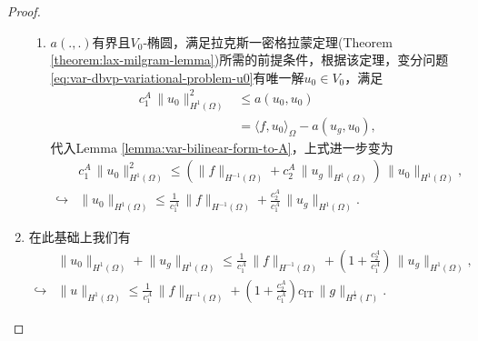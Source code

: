 \begin{proof}
\begin{enumerate}
\begin{enumerate}
    \item $a(.,.)$有界且$V_0$-椭圆，满足拉克斯一密格拉蒙定理(Theorem \ref{theorem:lax-milgram-lemma})所需的前提条件，根据该定理，变分问题\eqref{eq:var-dbvp-variational-problem-u0}有唯一解$u_0 \in V_0$，满足
    \begin{equation*}
      \begin{split}
        c_1^A \, \big\| u_0 \big\|_{H^1(\Omega)}^2 & \le a(u_0, u_0) \\
        & = \langle f, u_0 \rangle_{\Omega} - a(u_g, u_0),
      \end{split}
    \end{equation*}
    代入Lemma \ref{lemma:var-bilinear-form-to-A}，上式进一步变为
    \begin{equation*}
      \begin{split}
        &c_1^A \, \big\| u_0 \big\|_{H^1(\Omega)}^2  \le
        \left(
        \big\| f \big\|_{H^{-1}(\Omega)} + c_2^A \, \big\| u_g \big\|_{H^{1}(\Omega)}
        \right) \, \big\| u_0 \big\|_{H^{1}(\Omega)},\\
        \hookrightarrow &
        \big\| u_0 \big\|_{H^1(\Omega)} \le \frac{1}{c_1^A} \, \big\|f \big\|_{H^{-1}(\Omega)} + \frac{c_2^A}{c_1^A} \, \big\|u_g \big\|_{H^{1}(\Omega)}.
      \end{split}
    \end{equation*}
  \end{enumerate}

  \item 在此基础上我们有
  \begin{equation}
    \begin{split}
      &\big\| u_0 \big\|_{H^1(\Omega)} + \big\| u_g \big\|_{H^1(\Omega)} \le
      \frac{1}{c_1^A} \, \big\|f \big\|_{H^{-1}(\Omega)} + \left( 1+  \frac{c_2^A}{c_1^A} \right) \, \big\|u_g \big\|_{H^{1}(\Omega)}, \\
      \hookrightarrow &\big\| u \big\|_{H^{1}(\Omega)} \le \frac{1}{c_1^A} \, \big\| f \big\|_{H^{-1}(\Omega)} + \left( 1 + \frac{c_2^A}{c_1^A} \right) c_{\text{IT}} \, \big\| g \big\|_{H^{\frac{1}{2}}(\Gamma)}.
    \end{split}
  \end{equation}
\end{enumerate}
\end{proof}


